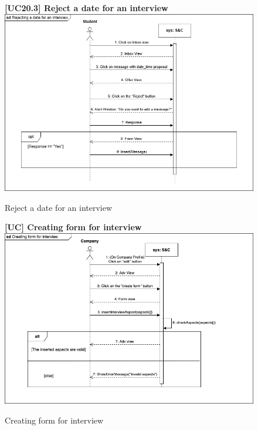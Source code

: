 \begin{figure}[H]
\textbf{[UC20.3] Reject a date for an interview}\newline\newline
\includegraphics[width=15cm]{Images/UC_diagram/RASD-UC20.drawio.png}
    \caption{Reject a date for an interview}
\end{figure}

\begin{figure}[H]
\textbf{[UC\nextUCDiagr] Creating form for interview}\newline\newline
    \includegraphics[width=15cm]{Images/UC_diagram/RASD-UC21(1).drawio.png}
    \caption{Creating form for interview}
\end{figure}


